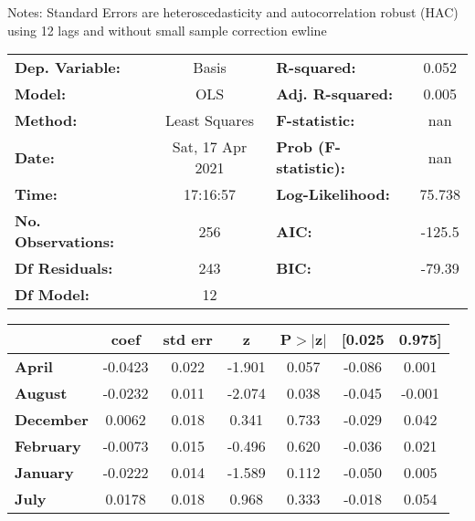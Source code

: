 Notes: \newline
 [1] Standard Errors are heteroscedasticity and autocorrelation robust (HAC) using 12 lags and without small sample correction
ewline\begin{center}
\begin{tabular}{lclc}
\toprule
\textbf{Dep. Variable:}    &      Basis       & \textbf{  R-squared:         } &     0.052   \\
\textbf{Model:}            &       OLS        & \textbf{  Adj. R-squared:    } &     0.005   \\
\textbf{Method:}           &  Least Squares   & \textbf{  F-statistic:       } &       nan   \\
\textbf{Date:}             & Sat, 17 Apr 2021 & \textbf{  Prob (F-statistic):} &      nan    \\
\textbf{Time:}             &     17:16:57     & \textbf{  Log-Likelihood:    } &    75.738   \\
\textbf{No. Observations:} &         256      & \textbf{  AIC:               } &    -125.5   \\
\textbf{Df Residuals:}     &         243      & \textbf{  BIC:               } &    -79.39   \\
\textbf{Df Model:}         &          12      & \textbf{                     } &             \\
\bottomrule
\end{tabular}
\begin{tabular}{lcccccc}
                   & \textbf{coef} & \textbf{std err} & \textbf{z} & \textbf{P$> |$z$|$} & \textbf{[0.025} & \textbf{0.975]}  \\
\midrule
\textbf{April}     &      -0.0423  &        0.022     &    -1.901  &         0.057        &       -0.086    &        0.001     \\
\textbf{August}    &      -0.0232  &        0.011     &    -2.074  &         0.038        &       -0.045    &       -0.001     \\
\textbf{December}  &       0.0062  &        0.018     &     0.341  &         0.733        &       -0.029    &        0.042     \\
\textbf{February}  &      -0.0073  &        0.015     &    -0.496  &         0.620        &       -0.036    &        0.021     \\
\textbf{January}   &      -0.0222  &        0.014     &    -1.589  &         0.112        &       -0.050    &        0.005     \\
\textbf{July}      &       0.0178  &        0.018     &     0.968  &         0.333        &       -0.018    &        0.054     \\

\end{tabular}
\end{center}
